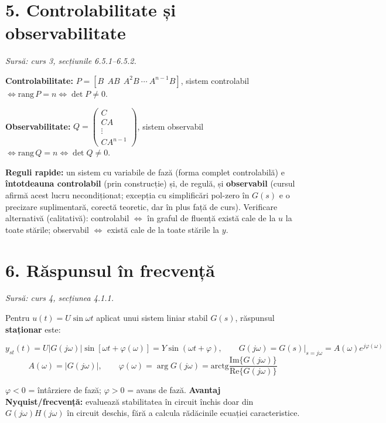 \documentclass[10pt,a4paper]{article}
\newcommand{\srcnote}[1]{{\footnotesize\color{gray!55!black}\textit{Sursă: #1}}\par}
\begin{document}
\section*{5. Controlabilitate și observabilitate}\label{sec:5}
\srcnote{curs 3, secțiunile 6.5.1–6.5.2.}
\begin{keyeq}\color{red!65!black}
\textbf{Controlabilitate:} $P=[B\ \ AB\ \ A^2B\ \cdots\ A^{n-1}B]$, sistem controlabil $\iff \mathrm{rang}\,P=n\iff\det P\ne0$.

\textbf{Observabilitate:} $Q=\begin{pmatrix}C\\CA\\\vdots\\CA^{n-1}\end{pmatrix}$, sistem observabil $\iff \mathrm{rang}\,Q=n\iff\det Q\ne0$.
\end{keyeq}
\textbf{Reguli rapide:} un sistem cu variabile de fază (forma complet controlabilă) e \textbf{întotdeauna controlabil} (prin construcție) și, de regulă, și \textbf{observabil} (cursul afirmă acest lucru necondiționat; excepția cu simplificări pol-zero în $G(s)$ e o precizare suplimentară, corectă teoretic, dar în plus față de curs). Verificare alternativă (calitativă): controlabil $\iff$ în graful de fluență există cale de la $u$ la toate stările; observabil $\iff$ există cale de la toate stările la $y$.

\section*{6. Răspunsul în frecvență}\label{sec:6}
\srcnote{curs 4, secțiunea 4.1.1.}
Pentru $u(t)=U\sin\omega t$ aplicat unui sistem liniar stabil $G(s)$, răspunsul \textbf{staționar} este:
\begin{keyeq}\color{red!65!black}
$$y_{st}(t)=U|G(j\omega)|\sin[\omega t+\varphi(\omega)]=Y\sin(\omega t+\varphi),\qquad G(j\omega)=G(s)|_{s=j\omega}=A(\omega)e^{j\varphi(\omega)}$$
$$A(\omega)=|G(j\omega)|,\qquad \varphi(\omega)=\arg G(j\omega)=\mathrm{arctg}\dfrac{\mathrm{Im}\{G(j\omega)\}}{\mathrm{Re}\{G(j\omega)\}}$$
\end{keyeq}
$\varphi<0$ = întârziere de fază; $\varphi>0$ = avans de fază. \textbf{Avantaj Nyquist/frecvență:} evaluează stabilitatea în circuit închis doar din $G(j\omega)H(j\omega)$ în circuit deschis, fără a calcula rădăcinile ecuației caracteristice.
\end{document}

